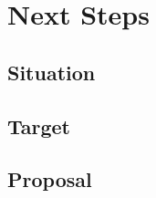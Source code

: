 {\let\cleardoublepage\relax \chapter{Next Steps}}

\section{Situation}

\section{Target}

\section{Proposal}